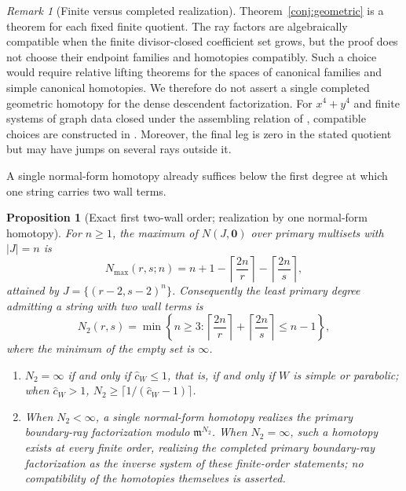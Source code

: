\documentclass[11pt]{amsart}
\newtheorem{proposition}[theorem]{Proposition}
\theoremstyle{definition}
\theoremstyle{remark}
\newtheorem{remark}[theorem]{Remark}
\newcommand{\chat}{\hat{c}}
\begin{document}
\begin{remark}[Finite versus completed realization]
Theorem~\ref{conj:geometric} is a theorem for each fixed finite quotient.  The
ray factors are algebraically compatible when the finite divisor-closed
coefficient set grows,
but the proof does not choose their endpoint families and homotopies
compatibly.  Such a choice would require relative lifting theorems for the
spaces of canonical families and simple canonical homotopies.  We therefore
do not assert a single completed geometric homotopy for the dense descendent
factorization.  For $x^4+y^4$ and finite systems of graph data closed under
the assembling relation of \cite{GKT}, compatible choices are constructed in
\cite[Theorem~5.7 and Appendix~B]{annular}.  Moreover, the final leg is zero
in the stated quotient but may have jumps on several rays outside it.
\end{remark}

A single normal-form homotopy already suffices below the first degree at which
one string carries two wall terms.

\begin{proposition}[Exact first two-wall order; realization by one
normal-form homotopy]
\label{prop:parabolicgeom}
For $n\ge1$, the maximum of
$N(J,\mathbf0)$ over primary multisets with $\lvert J\rvert=n$ is
\[
N_{\max}(r,s;n)
=n+1-\left\lceil\frac{2n}{r}\right\rceil
-\left\lceil\frac{2n}{s}\right\rceil ,
\]
attained by $J=\{(r-2,s-2)^n\}$. Consequently the least primary degree
admitting a string with two wall terms is
\[
N_2(r,s)=
\min\left\{n\ge3:
\left\lceil\frac{2n}{r}\right\rceil+
\left\lceil\frac{2n}{s}\right\rceil\le n-1\right\},
\]
where the minimum of the empty set is $\infty$.
\begin{enumerate}
\item[(i)] $N_{2}=\infty$ if and only if $\chat_{W}\le1$, that is, if and only if
$W$ is simple or parabolic; when $\chat_W>1$,
$N_{2}\ge\lceil 1/(\chat_{W}-1)\rceil$.
\item[(ii)] When $N_2<\infty$, a single normal-form
homotopy realizes the primary boundary-ray factorization modulo $\mathfrak m^{N_{2}}$. When
$N_2=\infty$, such a homotopy exists at every finite order, realizing the
completed primary boundary-ray factorization as the inverse system of these finite-order
statements; no compatibility of the homotopies themselves is asserted.
\end{enumerate}
\end{proposition}
\end{document}
